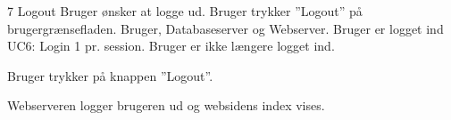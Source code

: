 
\uchead
	{7}
	{Logout}
	{Bruger ønsker at logge ud.}
	{Bruger trykker ''Logout'' på brugergrænsefladen.}
	{Bruger, Databaseserver og Webserver.}
	{Bruger er logget ind}
	{UC6: Login}
	{1 pr. session.}
	{Bruger er ikke længere logget ind.}

\item Bruger trykker på knappen ''Logout''. 

\item Webserveren logger brugeren ud og websidens index vises.

\ucdescriptionend

		
